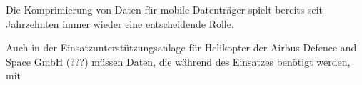 Die Komprimierung von Daten für mobile Datenträger spielt bereits seit Jahrzehnten immer wieder eine entscheidende Rolle. 

Auch in der Einsatzunterstützungsanlage für Helikopter der Airbus Defence and Space GmbH (???) müssen Daten, die während des Einsatzes benötigt werden, mit 